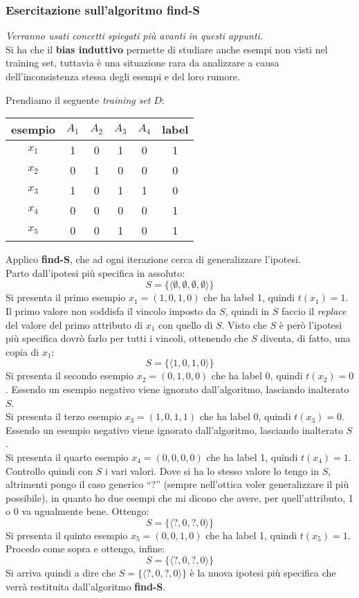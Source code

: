 \subsubsection{Esercitazione sull'algoritmo find-S}
\textit{Verranno usati concetti spiegati più avanti in questi appunti.}\\
Si ha che il \textbf{bias induttivo} permette di studiare anche esempi non
visti nel training set, tuttavia è una situazione rara da analizzare a causa
dell'inconsistenza stessa degli esempi e del loro rumore.
\begin{esempio}
  Prendiamo il seguente \textit{training set} $D$:
  \begin{table}[H]
    \centering
    \begin{tabular}[H]{c|cccc|c}
      esempio & $A_1$  & $A_2$  & $A_3$  & $A_4$ & label\\
      \hline
      $x_1$ & 1 & 0 & 1 & 0 & 1\\
      $x_2$ & 0 & 1 & 0 & 0 & 0\\
      $x_3$ & 1 & 0 & 1 & 1 & 0\\
      $x_4$ & 0 & 0 & 0 & 0 & 1\\
      $x_5$ & 0 & 0 & 1 & 0 & 1\\
    \end{tabular}
  \end{table}
  Applico \textbf{find-S}, che ad ogni iterazione cerca di generalizzare l'ipotesi.\\
  Parto dall'ipotesi più specifica in assoluto:
  \[S=\{\langle\emptyset,\emptyset,\emptyset,\emptyset\rangle\}\]
  Si presenta il primo esempio $x_1=(1, 0, 1, 0)$ che ha label 1, quindi
  $t(x_1)=1$. Il primo valore non soddisfa il vincolo imposto da
  $S$, quindi in $S$ faccio il \textit{replace} del valore del primo attributo
  di $x_1$ con quello di $S$. Visto che $S$ è però l'ipotesi più specifica dovrò
  farlo per tutti i vincoli, ottenendo che $S$ diventa, di fatto, una copia di
  $x_1$: 
  \[S=\{\langle 1, 0, 1, 0\rangle\}\]
  Si presenta il secondo esempio $x_2=(0, 1, 0, 0)$ che ha label 0, quindi
  $t(x_2)=0$. Essendo un esempio negativo viene ignorato dall'algoritmo,
  lasciando inalterato $S$.\\
  Si presenta il terzo esempio $x_3=(1, 0, 1, 1)$ che ha label 0, quindi
  $t(x_3)=0$. Essendo un esempio negativo viene ignorato dall'algoritmo,
  lasciando inalterato $S$.\\
  Si presenta il quarto esempio $x_4=(0, 0, 0, 0)$ che ha label 1, quindi
  $t(x_4)=1$. Controllo quindi con $S$ i vari valori. Dove si ha lo stesso
  valore lo tengo in $S$, altrimenti pongo il caso generico ``?'' (sempre
  nell'ottica voler generalizzare il più possibile), in quanto ho
  due esempi che mi dicono che avere, per quell'attributo, 1 o 0 va ugualmente
  bene. Ottengo:
  \[S=\{\langle ?, 0,?, 0\rangle\}\]
  Si presenta il quinto esempio $x_5=(0, 0, 1, 0)$ che ha label 1, quindi
  $t(x_5)=1$. Procedo come sopra e ottengo, infine:
  \[S=\{\langle ?, 0,?, 0\rangle\}\]
  Si arriva quindi a dire che $S=\{\langle ?, 0,?, 0\rangle\}$ è la nuova ipotesi
  più specifica che verrà restituita dall'algoritmo \textbf{find-S}.
\end{esempio}
